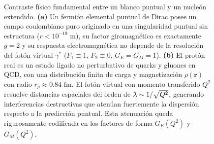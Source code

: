 \documentclass[10pt,a4paper]{article}
\newcommand{\lambdabar}{\mathchar'26\mkern-9mu\lambda}
\begin{document}
\begin{figure}[t]
\caption{Contraste físico fundamental entre un blanco puntual y un nucleón extendido. \textbf{(a)} Un fermión elemental puntual de Dirac posee un campo coulombiano puro originado en una singularidad puntual sin estructura ($r < 10^{-19}\text{ m}$), su factor giromagnético es exactamente $g=2$ y su respuesta electromagnética no depende de la resolución del fotón virtual $\gamma^*$ ($F_1 \equiv 1$, $F_2 \equiv 0$, $G_E = G_M = 1$). \textbf{(b)} El protón real es un estado ligado no perturbativo de quarks y gluones en QCD, con una distribución finita de carga y magnetización $\rho(\mathbf{r})$ con radio $r_p \approx 0.84\text{ fm}$. El fotón virtual con momento transferido $Q^2$ resuelve distancias espaciales del orden de $\lambdabar \sim 1/\sqrt{Q^2}$, generando interferencias destructivas que atenúan fuertemente la dispersión respecto a la predicción puntual. Esta atenuación queda rigurosamente codificada en los factores de forma $G_E(Q^2)$ y $G_M(Q^2)$.}
\label{fig:puntual_vs_extendido}
\end{figure}
\end{document}
